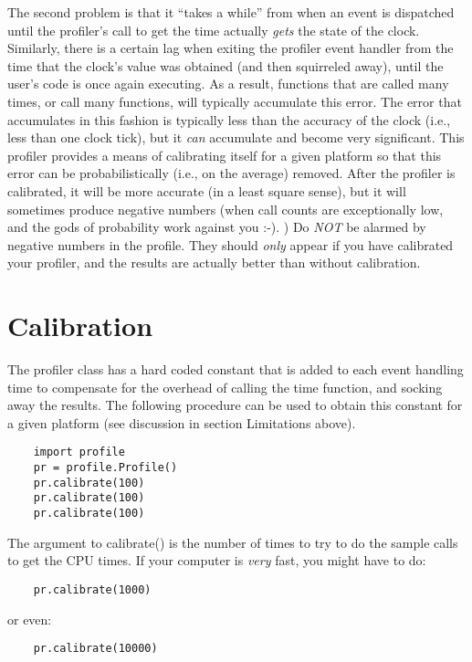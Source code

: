 The second problem is that it ``takes a while'' from when an event is
dispatched until the profiler's call to get the time actually
\emph{gets} the state of the clock.  Similarly, there is a certain lag
when exiting the profiler event handler from the time that the clock's
value was obtained (and then squirreled away), until the user's code
is once again executing.  As a result, functions that are called many
times, or call many functions, will typically accumulate this error.
The error that accumulates in this fashion is typically less than the
accuracy of the clock (i.e., less than one clock tick), but it
\emph{can} accumulate and become very significant.  This profiler
provides a means of calibrating itself for a given platform so that
this error can be probabilistically (i.e., on the average) removed.
After the profiler is calibrated, it will be more accurate (in a least
square sense), but it will sometimes produce negative numbers (when
call counts are exceptionally low, and the gods of probability work
against you :-). )  Do \emph{NOT} be alarmed by negative numbers in
the profile.  They should \emph{only} appear if you have calibrated
your profiler, and the results are actually better than without
calibration.


\section{Calibration}

The profiler class has a hard coded constant that is added to each
event handling time to compensate for the overhead of calling the time
function, and socking away the results.  The following procedure can
be used to obtain this constant for a given platform (see discussion
in section Limitations above).

\begin{verbatim}
    import profile
    pr = profile.Profile()
    pr.calibrate(100)
    pr.calibrate(100)
    pr.calibrate(100)
\end{verbatim}

The argument to calibrate() is the number of times to try to do the
sample calls to get the CPU times.  If your computer is \emph{very}
fast, you might have to do:

\begin{verbatim}
    pr.calibrate(1000)
\end{verbatim}

or even:

\begin{verbatim}
    pr.calibrate(10000)
\end{verbatim}

